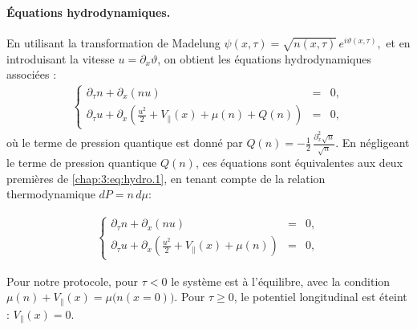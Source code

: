 \paragraph{Équations hydrodynamiques.}
En utilisant la transformation de Madelung 
\(
\psi(x,\tau) = \sqrt{n(x,\tau)} \, e^{i \vartheta(x,\tau)},
\)
et en introduisant la vitesse $u = \partial_x \vartheta$, on obtient les équations hydrodynamiques associées :
\begin{eqnarray}\label{chap:5:eq.hydro.1}
	\left\{
	\begin{array}{rcl}
		\partial_\tau n + \partial_x ( n u )	 & = & 0, \\[0.3em]
		\partial_\tau u + \partial_x \left( \tfrac{u^2}{2} + V_\parallel(x) + \mu(n) + Q(n) \right) & = & 0,
	\end{array} 
	\right.
\end{eqnarray}
où le terme de pression quantique est donné par
\(
Q(n) = - \frac{1}{2} \, \frac{\partial_x^2 \sqrt{n}}{\sqrt{n}}.
\)
En négligeant le terme de pression quantique $Q(n)$, ces équations sont équivalentes aux deux premières de \eqref{chap:3:eq:hydro.1}, en tenant compte de la relation thermodynamique $dP = n \, d\mu$:

\begin{eqnarray}\label{chap:5:eq.hydro.1.1}
	\left\{
	\begin{array}{rcl}
		\partial_\tau n + \partial_x ( n u )	 & = & 0, \\[0.3em]
		\partial_\tau u + \partial_x \left( \tfrac{u^2}{2} + V_\parallel(x) + \mu(n) \right) & = & 0,
	\end{array} 
	\right.
\end{eqnarray}

\medskip

Pour notre protocole, pour $\tau < 0$ le système est à l’équilibre, avec la condition
\(
\mu(n) + V_\parallel(x) = \mu\bigl(n(x=0)\bigr).
\)
Pour $\tau \geq 0$, le potentiel longitudinal est éteint : $V_\parallel(x) = 0$.

\medskip


